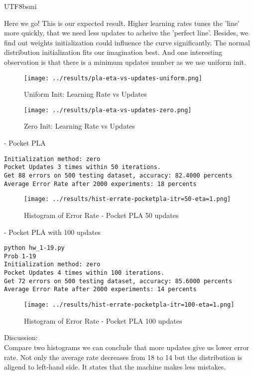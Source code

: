 \documentclass[12pt]{article}
\newenvironment{prob}[2][Prob.]{\begin{trivlist}
\item[\hskip \labelsep {\bfseries #1}\hskip \labelsep {\bfseries #2}]}{\end{trivlist}}
\begin{document}
\begin{CJK}{UTF8}{bsmi}
\begin{prob}{17}
Here we go! This is our expected result. Higher learning rates tunes the 'line' more quickly, that we need less updates to acheive the 'perfect line'. Besides, we find out weights initialization could influence the curve significantly. The normal distribution initialization fits our imagination best. And one interesting observation is that there is a minimum updates number as we use uniform init. 
\begin{figure}[H]
	\centering
	\texttt{[image: ../results/pla-eta-vs-updates-uniform.png]}
	\caption{Uniform Init: Learning Rate vs Updates}
	\label{fig-1-17}
\end{figure}

\begin{figure}[H]
	\centering
	\texttt{[image: ../results/pla-eta-vs-updates-zero.png]}
	\caption{Zero Init: Learning Rate vs Updates}
	\label{fig-1-17}
\end{figure}

\end{prob}

\begin{prob}{18} - Pocket PLA\\
\begin{lstlisting}
Initialization method: zero
Pocket Updates 3 times within 50 iterations.
Get 88 errors on 500 testing dataset, accuracy: 82.4000 percents
Average Error Rate after 2000 experiments: 18 percents
\end{lstlisting}
\begin{figure}[H]
	\centering
	\texttt{[image: ../results/hist-errate-pocketpla-itr=50-eta=1.png]}
	\caption{Histogram of Error Rate - Pocket PLA 50 updates}
	\label{fig-1-18}
\end{figure}
\end{prob}

\begin{prob}{19} - Pocket PLA with 100 updates\\
\begin{lstlisting}
python hw_1-19.py
Prob 1-19
Initialization method: zero
Pocket Updates 4 times within 100 iterations.
Get 72 errors on 500 testing dataset, accuracy: 85.6000 percents
Average Error Rate after 2000 experiments: 14 percents
\end{lstlisting}
\begin{figure}[H]
	\centering
	\texttt{[image: ../results/hist-errate-pocketpla-itr=100-eta=1.png]}
	\caption{Histogram of Error Rate - Pocket PLA 100 updates}
	\label{fig-1-19}
\end{figure}
Discussion:\\
Compare two histograms we can conclude that more updates give us lower error rate. Not only the average rate decreases from 18 to 14 but the distribution is aligend to left-hand side. It states that the machine makes less mistakes.


\end{prob}
\end{CJK}
\end{document}
